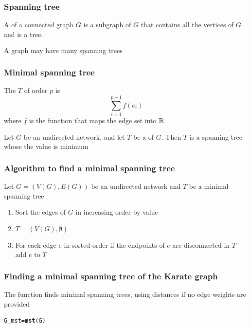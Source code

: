 \documentclass[aspectratio=169]{beamer}\usepackage[]{graphicx}\usepackage[]{xcolor}
\makeatletter
\newcommand{\hldef}[1]{\textcolor[rgb]{0.345,0.345,0.345}{#1}}%
\newcommand{\hlkwb}[1]{\textcolor[rgb]{0.69,0.353,0.396}{#1}}%
\newcommand{\hlkwd}[1]{\textcolor[rgb]{0.737,0.353,0.396}{\textbf{#1}}}%
\newenvironment{kframe}{%
 \def\at@end@of@kframe{}%
 \ifinner\ifhmode%
  \def\at@end@of@kframe{\end{minipage}}%
  \begin{minipage}{\columnwidth}%
 \fi\fi%
 \def\FrameCommand##1{\hskip\@totalleftmargin \hskip-\fboxsep
 \colorbox{shadecolor}{##1}\hskip-\fboxsep
     \hskip-\linewidth \hskip-\@totalleftmargin \hskip\columnwidth}%
 \MakeFramed {\advance\hsize-\width
   \@totalleftmargin\z@ \linewidth\hsize
   \@setminipage}}%
 {\par\unskip\endMakeFramed%
 \at@end@of@kframe}
\newenvironment{knitrout}{}{} %
\makeatother
\begin{document}
\begin{frame}\frametitle{Spanning tree}
	\begin{definition}
	A  of a connected graph $G$ is a subgraph of $G$ that contains all the vertices of $G$ and is a tree.
	\end{definition}
	\vfill
	A graph may have many spanning trees
\end{frame}


\begin{frame}\frametitle{Minimal spanning tree}
	\begin{definition}
	The  $T$ of order $p$ is
	$$\sum_{i=1}^{p-1}f(e_i)$$
	where $f$ is the function that maps the edge set into $\mathbb{R}$
	\end{definition}
	\vfill
	\begin{definition}
	Let $G$ be an undirected network, and let $T$ be a  of $G$. Then $T$ is a spanning tree whose the value is minimum
	\end{definition}
\end{frame}

\begin{frame}\frametitle{Algorithm to find a minimal spanning tree}
Let $G=(V(G),E(G))$ be an undirected network and $T$ be a minimal spanning tree 
\vfill
\begin{enumerate}
\item Sort the edges of $G$ in increasing order by value
\item $T=(V(G),\emptyset)$
\item For each edge $e$ in sorted order
        if the endpoints of $e$ are disconnected in $T$
        add $e$ to $T$
\end{enumerate}
\end{frame}


\begin{frame}[fragile]\frametitle{Finding a minimal spanning tree of the Karate graph}
The function  finds minimal spanning trees, using distances if no edge weights are provided
\begin{knitrout}
\color{fgcolor}\begin{kframe}
\begin{alltt}
\hldef{G_mst} \hlkwb{=} \hlkwd{mst}\hldef{(G)}
\end{alltt}
\end{kframe}
\end{knitrout}
\end{frame}
\end{document}
